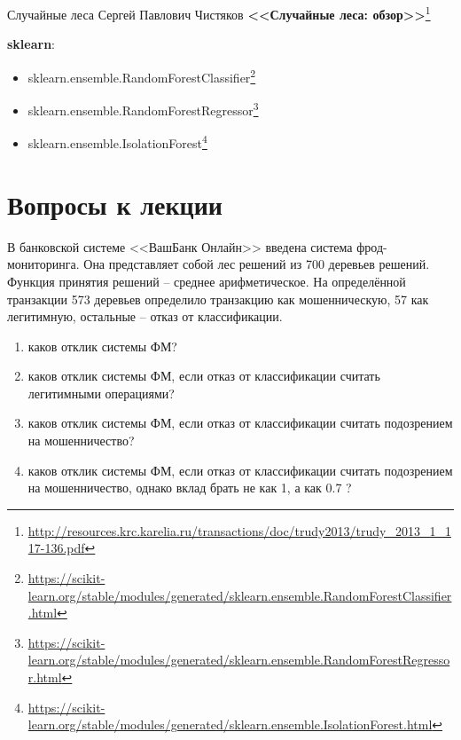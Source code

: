 \documentclass{beamer}
\begin{document}
  \begin{frame}{Случайные леса}
  Сергей Павлович Чистяков \textbf{<<Случайные леса: обзор>>}\footnote{\tiny
\url{http://resources.krc.karelia.ru/transactions/doc/trudy2013/trudy_2013_1_117-136.pdf}
}

	\textbf{sklearn}:
	\begin{itemize}
		\item sklearn.ensemble.RandomForestClassifier\footnote{
			\tiny \url{https://scikit-learn.org/stable/modules/generated/sklearn.ensemble.RandomForestClassifier.html}
		}
		\item sklearn.ensemble.RandomForestRegressor\footnote{
			\tiny
			\url{https://scikit-learn.org/stable/modules/generated/sklearn.ensemble.RandomForestRegressor.html}
		}
	    \item sklearn.ensemble.IsolationForest\footnote{
	       \tiny
	       \url{https://scikit-learn.org/stable/modules/generated/sklearn.ensemble.IsolationForest.html}
    	}
	\end{itemize}
  \end{frame}
  
  \section{Вопросы к лекции}
  
  \begin{frame}
  В банковской системе <<ВашБанк Онлайн>> введена система фрод-мониторинга. 
  Она представляет собой лес решений из 700 деревьев решений. Функция принятия решений -- среднее арифметическое. На определённой транзакции 573 деревьев определило транзакцию как мошенническую, 57 как легитимную, остальные -- отказ от классификации.
  \begin{enumerate}
     \item каков отклик системы ФМ?
     \item каков отклик системы ФМ, если отказ от классификации считать легитимными операциями?
     \item каков отклик системы ФМ, если отказ от классификации считать подозрением на мошенничество?
     \item каков отклик системы ФМ, если отказ от классификации считать подозрением на мошенничество, однако вклад брать не как 1, а как 0.7 ?
  \end{enumerate}
  
  \end{frame}
\end{document}
